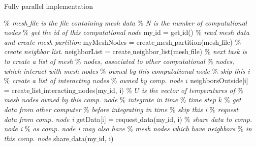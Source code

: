 \documentclass[11pt,twocolumn]{amsart}
\theoremstyle{definition}
\theoremstyle{definition}
\numberwithin{equation}{section}
\numberwithin{equation}{section}
\begin{document}
\begin{algorithm}[ht]
	\caption{Fully parallel implementation}
	\label{alg:parallel}
	\begin{algorithmic}[1]
		\STATE \textcolor{mygray}{\it $\%$ mesh$\_$file is the file containing mesh data}
		\STATE \textcolor{mygray}{\it $\%$ N is the number of computational nodes}
		\STATE
		\STATE \textcolor{mygray}{\it $\%$ get the id of this computational node }
		\STATE my$\_$id = get$\_$id()
		\STATE
		\STATE \textcolor{mygray}{\it $\%$ read mesh data and create mesh partition}
		\STATE myMeshNodes = create$\_$mesh$\_$partition(mesh$\_$file)
		\STATE
		\STATE \textcolor{mygray}{\it $\%$ create neighbor list.}
		\STATE neighborList = create$\_$neighbor$\_$list(mesh$\_$file)
		\STATE
		\STATE \textcolor{mygray}{\it $\%$ next task is to create a list of mesh}
		\STATE \textcolor{mygray}{\it $\%$ nodes, associated to other computational} 
		\STATE \textcolor{mygray}{\it $\%$ nodes, which interact with mesh nodes}
		\STATE \textcolor{mygray}{\it $\%$ owned by this computational node}
				\STATE \textcolor{mygray}{\it $\%$ skip this i}
			\ELSE
				\STATE \textcolor{mygray}{\it $\%$ create a list of interacting nodes}
				\STATE \textcolor{mygray}{\it $\%$ owned by comp. node $i$}
				\STATE neighborsOutside[i] 
				\STATE \; = create$\_$list$\_$interacting$\_$nodes(my$\_$id, i)			
			\ENDIF
		\ENDFOR
		\STATE
		\STATE \textcolor{mygray}{\it $\%$ $U$ is the vector of temperatures of}
		\STATE \textcolor{mygray}{\it $\%$ mesh nodes owned by this comp. node}
		\STATE 
		\STATE \textcolor{mygray}{\it $\%$ integrate in time}
			\STATE \textcolor{mygray}{\it $\%$ time step $k$}
			\STATE 
			\STATE \textcolor{mygray}{\it $\%$ get data from other computer }
			\STATE \textcolor{mygray}{\it $\%$ before integrating in time}
					\STATE \textcolor{mygray}{\it $\%$ skip this i}
				\ELSE
					\STATE \textcolor{mygray}{\it $\%$ request data from comp. node i}
					\STATE getData[i] = request$\_$data(my$\_$id, i)
					\STATE 
					\STATE \textcolor{mygray}{\it $\%$ share data to comp. node i}
					\STATE \textcolor{mygray}{\it $\%$ as comp. node i may also have}
					\STATE \textcolor{mygray}{\it $\%$ mesh nodes which have neighbors }
					\STATE \textcolor{mygray}{\it $\%$ in this comp. node}
					\STATE share$\_$data(my$\_$id, i)
				\ENDIF
			\ENDFOR
	\end{algorithmic}
\end{algorithm}
\end{document}
